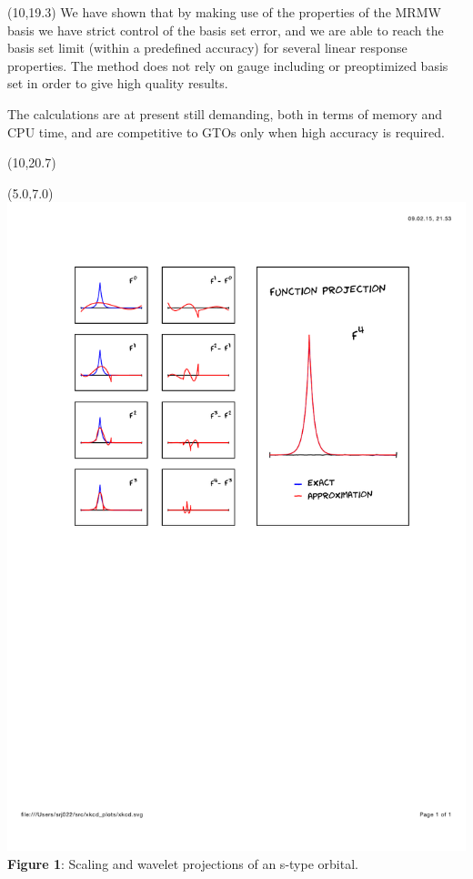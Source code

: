 \documentclass[a0,portrait]{a0poster}
\def\LHead#1{\noindent{\LARGE\color{DarkBlue} #1}\smallskip}
\begin{document}

\begin{textblock}{7}(10,19.3)
We have shown that by making use of the properties of the MRMW
basis we have strict control of the basis set error, and we are able to 
reach the basis set limit (within a predefined accuracy) for several linear
response properties. The method does not rely on gauge including or 
preoptimized basis set in order to give high quality results.

The calculations are at present still demanding, both in terms of memory and CPU
time, and are competitive to GTOs only when high accuracy is required.
\end{textblock}

\begin{textblock}{7}(10,20.7)
\renewcommand\refname{\textnormal{\LHead{References}}}

%

\end{textblock}


\begin{textblock}{4.5}(5.0,7.0)
    \includegraphics[scale=1.3, viewport = 85 420 550 760, clip]{figures/func_rep_2.pdf}
    \footnotesize
    \centering
    \\\textbf{Figure 1}: Scaling and wavelet projections of an s-type orbital.
\end{textblock} 
\end{document}
